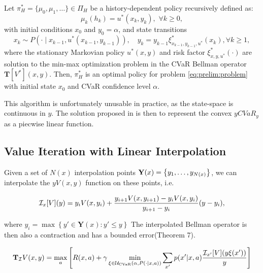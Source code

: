 \begin{theorem}\label{thm:vi:optimalpolicy}
Let $\pi_H^*=\{\mu_0,\mu_1,\ldots\}\in\Pi_H$ be a history-dependent policy recursively defined as:
\begin{equation}\label{eq:policy_construct}
\mu_k(h_k) = u^*(x_k, y_k),\,\,\forall k\geq 0,
\end{equation}
with initial conditions $x_0$ and $y_0=\alpha$, and state transitions
\begin{equation}\label{eq:opt_state}
x_k\sim P(\cdot\mid x_{k-1},u^*(x_{k-1},y_{k-1})),\quad y_k = y_{k-1}\xi_{x_{k-1},y_{k-1},u^*}^*(x_k), \forall k\geq 1,
\end{equation}
where the stationary Markovian policy $u^*(x,y)$ and risk factor $\xi_{x,y,u^*}^*(\cdot)$ are solution to the  min-max optimization problem in the CVaR Bellman operator $\mathbf T[V^*](x,y)$.
Then, $\pi^*_H$ is an optimal policy for problem \eqref{eq:prelim:problem} with initial state $x_0$ and CVaR confidence level $\alpha$.
\end{theorem}


This algorithm is unfortunately unusable in practice, as the state-space is continuous in $y$. The solution proposed in \cite{chow2015risk} is then to represent the convex $y CVaR_y$ as a piecwise linear function. 

\subsection{Value Iteration with Linear Interpolation}

Given a set of $N(x)$ interpolation points $\mathbf{Y}(x) = \left\{ {y_1, \dots, y_{N(x)}} \right\}$, we can interpolate the $yV(x,y)$ function on these points, i.e.

\begin{equation*}
\mathcal{I}_{x}[V](y)=y_iV(x,y_{i})+\frac{y_{i+1}V(x,y_{i+1})-y_iV(x,y_{i})}{y_{i+1}-y_i}(y-y_i),
\end{equation*}

where $y_i = \max \left\{y'\in \mathbf{Y}(x) : y' \leq y\right\}$
The interpolated Bellman operator is then also a contraction and has a bounded error(Theorem 7). 


\begin{equation}\label{eq:vi:linearbellman}
\mathbf{T}_{\mathcal{I}} V(x, y) = \max_a \left[ { R(x, a) + \gamma \min_{\xi \in \mathcal{U}_{\text{CVaR}}(\alpha, P(\cdot | x, a))} \sum_{x'} p(x'| x, a)\dfrac{\mathcal{I}_{x'} [V](y\xi(x'))}{y}} \right]
\end{equation}

